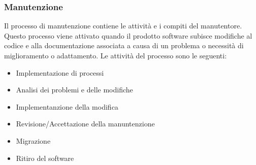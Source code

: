 \subsubsection{Manutenzione}
Il processo di manutenzione contiene le attività e i compiti del manutentore. Questo processo viene attivato quando il prodotto software subisce modifiche al codice e alla documentazione associata a causa di un problema o necessità di miglioramento o adattamento.
Le attività del processo sono le seguenti:
\begin{itemize}
\item Implementazione di processi
\item Analisi dei problemi e delle modifiche
\item Implementanzione della modifica
\item Revisione/Accettazione della manuntenzione
\item Migrazione
\item Ritiro del software
\end{itemize}


